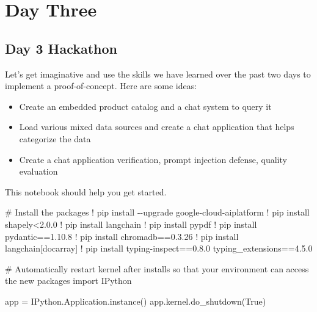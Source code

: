 \documentclass[
  letterpaper,
  DIV=11,
  numbers=noendperiod]{scrreprt}
\newenvironment{Shaded}{\begin{snugshade}}{\end{snugshade}}
\newcommand{\CommentTok}[1]{\textcolor[rgb]{0.37,0.37,0.37}{#1}}
\newcommand{\FloatTok}[1]{\textcolor[rgb]{0.68,0.00,0.00}{#1}}
\newcommand{\ImportTok}[1]{\textcolor[rgb]{0.00,0.46,0.62}{#1}}
\newcommand{\NormalTok}[1]{\textcolor[rgb]{0.00,0.23,0.31}{#1}}
\newcommand{\OperatorTok}[1]{\textcolor[rgb]{0.37,0.37,0.37}{#1}}
\newcommand{\VariableTok}[1]{\textcolor[rgb]{0.07,0.07,0.07}{#1}}
\begin{document}
\part{Day Three}

\hypertarget{day-3-hackathon}{%
\chapter{Day 3 Hackathon}\label{day-3-hackathon}}

Let's get imaginative and use the skills we have learned over the past
two days to implement a proof-of-concept. Here are some ideas:

\begin{itemize}
\item
  Create an embedded product catalog and a chat system to query it
\item
  Load various mixed data sources and create a chat application that
  helps categorize the data
\item
  Create a chat application verification, prompt injection defense,
  quality evaluation
\end{itemize}

This notebook should help you get started.

\begin{Shaded}
\begin{Highlighting}[]
\CommentTok{\# Install the packages}
\OperatorTok{!}\NormalTok{ pip install }\OperatorTok{{-}{-}}\NormalTok{upgrade google}\OperatorTok{{-}}\NormalTok{cloud}\OperatorTok{{-}}\NormalTok{aiplatform}
\OperatorTok{!}\NormalTok{ pip install shapely}\OperatorTok{\textless{}}\FloatTok{2.0.0}
\OperatorTok{!}\NormalTok{ pip install langchain}
\OperatorTok{!}\NormalTok{ pip install pypdf}
\OperatorTok{!}\NormalTok{ pip install pydantic}\OperatorTok{==}\FloatTok{1.10.8}
\OperatorTok{!}\NormalTok{ pip install chromadb}\OperatorTok{==}\FloatTok{0.3.26}
\OperatorTok{!}\NormalTok{ pip install langchain[docarray]}
\OperatorTok{!}\NormalTok{ pip install typing}\OperatorTok{{-}}\NormalTok{inspect}\OperatorTok{==}\FloatTok{0.8.0}\NormalTok{ typing\_extensions}\OperatorTok{==}\FloatTok{4.5.0}
\end{Highlighting}
\end{Shaded}

\begin{Shaded}
\begin{Highlighting}[]
\CommentTok{\# Automatically restart kernel after installs so that your environment can access the new packages}
\ImportTok{import}\NormalTok{ IPython}

\NormalTok{app }\OperatorTok{=}\NormalTok{ IPython.Application.instance()}
\NormalTok{app.kernel.do\_shutdown(}\VariableTok{True}\NormalTok{)}
\end{Highlighting}
\end{Shaded}
\end{document}
